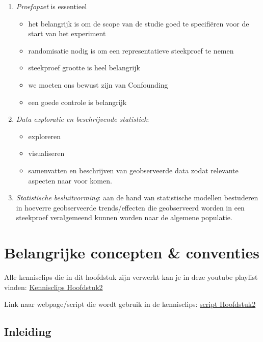 \documentclass[
  12pt,dutch,coursenotes]{book}
\providecommand{\tightlist}{%
  \setlength{\itemsep}{0pt}\setlength{\parskip}{0pt}}
\theoremstyle{definition}
\theoremstyle{definition}
\theoremstyle{definition}
\theoremstyle{remark}
\begin{document}
\begin{enumerate}
\def\labelenumi{\arabic{enumi}.}
\item
  \emph{Proefopzet} is essentieel

  \begin{itemize}
  \item
    het belangrijk is om de scope van de studie goed te specifiëren voor de start van het experiment
  \item
    randomisatie nodig is om een representatieve steekproef te nemen
  \item
    steekproef grootte is heel belangrijk
  \item
    we moeten ons bewust zijn van Confounding
  \item
    een goede controle is belangrijk
  \end{itemize}
\item
  \emph{Data exploratie en beschrijvende statistiek}:

  \begin{itemize}
  \tightlist
  \item
    exploreren
  \item
    visualiseren
  \item
    samenvatten en beschrijven van geobserveerde data zodat relevante aspecten naar voor komen.
  \end{itemize}
\item
  \emph{Statistische besluitvorming}: aan de hand van statistische modellen bestuderen in hoeverre geobserveerde trends/effecten die geobserveerd worden in een steekproef veralgemeend kunnen worden naar de algemene populatie.
\end{enumerate}

\hypertarget{belangrijke-concepten-conventies}{%
\chapter{Belangrijke concepten \& conventies}\label{belangrijke-concepten-conventies}}

Alle kennisclips die in dit hoofdstuk zijn verwerkt kan je in deze youtube playlist vinden: \href{https://www.youtube.com/playlist?list=PLZH1hP8_LbJJ7apU5sAbRlUsve2nWz5ev}{Kennisclips Hoofdstuk2}

Link naar webpage/script die wordt gebruik in de kennisclips: \href{https://statomics.github.io/sbc20/rmd/02-concepts.html}{script Hoofdstuk2}

\hypertarget{inleiding}{%
\section{Inleiding}\label{inleiding}}
\end{document}
